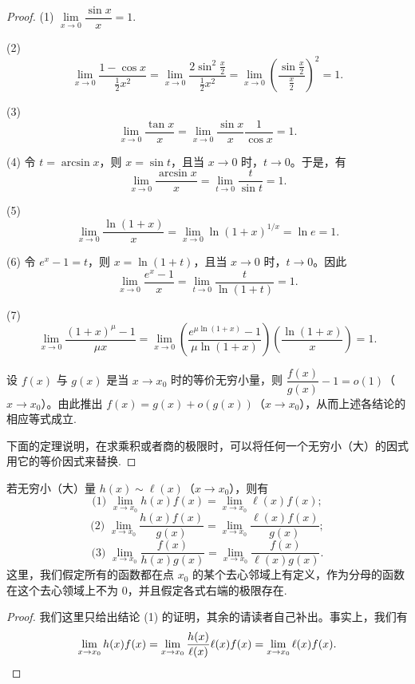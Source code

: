 \begin{proof}
(1) $\lim\limits_{x\to0}\dfrac{\sin x}{x}=1$.

(2)
\[
  \lim_{x\to0}\frac{1-\cos x}{\frac12x^2}
  =
  \lim_{x\to0}\frac{2\sin^2\frac x2}{\frac12x^2}
  =
  \lim_{x\to0}\left(\frac{\sin\frac x2}{\frac x2}\right)^2
  =
  1.
\]

(3)
\[
  \lim_{x\to0}\frac{\tan x}{x}
  =
  \lim_{x\to0}\frac{\sin x}{x}\frac1{\cos x}
  =
  1.
\]

(4) 令 $t=\arcsin x$，则 $x=\sin t$，且当 $x\to0$ 时，$t\to0$。于是，有
\[
  \lim_{x\to0}\frac{\arcsin x}{x}
  =
  \lim_{t\to0}\frac t{\sin t}
  =
  1.
\]

(5)
\[
  \lim_{x\to0}\frac{\ln(1+x)}x
  =
  \lim_{x\to0}\ln(1+x)^{1/x}
  =
  \ln e
  =
  1.
\]

(6) 令 $e^x-1=t$，则 $x=\ln(1+t)$，且当 $x\to0$ 时，$t\to0$。因此
\[
  \lim_{x\to0}\frac{e^x-1}{x}
  =
  \lim_{t\to0}\frac t{\ln(1+t)}
  =
  1.
\]

(7)
\[
  \lim_{x\to0}\frac{(1+x)^\mu-1}{\mu x}
  =
  \lim_{x\to0}
  \left(\frac{e^{\mu\ln(1+x)}-1}{\mu\ln(1+x)}\right)
  \left(\frac{\ln(1+x)}x\right)
  =
  1.
\]

设 $f(x)$ 与 $g(x)$ 是当 $x\to x_0$ 时的等价无穷小量，则 $\dfrac{f(x)}{g(x)}-1=o(1)$（$x\to x_0$）。由此推出 $f(x)=g(x)+o(g(x))$（$x\to x_0$），从而上述各结论的相应等式成立.

下面的定理说明，在求乘积或者商的极限时，可以将任何一个无穷小（大）的因式用它的等价因式来替换.
\end{proof}


\begin{theorem}\label{theorem:ma-3-4-2}
若无穷小（大）量 $h(x)\sim \ell(x)$（$x\to x_0$），则有
\[
  \text{(1) }\lim_{x\to x_0}h(x)f(x)=\lim_{x\to x_0}\ell(x)f(x);
\]
\[
  \text{(2) }\lim_{x\to x_0}\frac{h(x)f(x)}{g(x)}
  =
  \lim_{x\to x_0}\frac{\ell(x)f(x)}{g(x)};
\]
\[
  \text{(3) }\lim_{x\to x_0}\frac{f(x)}{h(x)g(x)}
  =
  \lim_{x\to x_0}\frac{f(x)}{\ell(x)g(x)}.
\]
这里，我们假定所有的函数都在点 $x_0$ 的某个去心邻域上有定义，作为分母的函数在这个去心领域上不为 $0$，并且假定各式右端的极限存在.
\end{theorem}


\begin{proof}
我们这里只给出结论 (1) 的证明，其余的请读者自己补出。事实上，我们有
\[
  \lim_{x\to x_0}h(x)f(x)
  =
  \lim_{x\to x_0}\frac{h(x)}{\ell(x)}\ell(x)f(x)
  =
  \lim_{x\to x_0}\ell(x)f(x).
\qedhere
\]
\end{proof}


